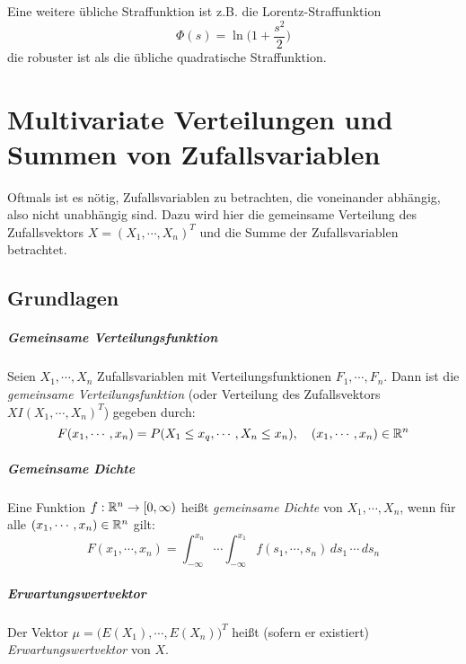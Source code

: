 	        Eine weitere übliche Straffunktion ist z.B. die Lorentz-Straffunktion
	        \begin{equation*}
		        \Phi(s) = \ln\Big(1 + \frac{s^2}{2}\Big)
	        \end{equation*}
	        die robuster ist als die übliche quadratische Straffunktion.

\chapter{Multivariate Verteilungen und Summen von Zufallsvariablen}
    Oftmals ist es nötig, Zufallsvariablen zu betrachten, die voneinander abhängig, also nicht unabhängig sind. Dazu wird hier die gemeinsame Verteilung des Zufallsvektors \( X = (X_1, \cdots, X_n)^T \) und die Summe der Zufallsvariablen betrachtet.

    \section{Grundlagen}
        \paragraph{Gemeinsame Verteilungsfunktion}
            Seien \( X_1, \cdots, X_n \) Zufallsvariablen mit Verteilungsfunktionen \( F_1, \cdots, F_n \). Dann ist die \textit{gemeinsame Verteilungsfunktion} (oder Verteilung des Zufallsvektors \( X I (X_1, \cdots, X_n)^T \)) gegeben durch:
            \begin{equation*}
	            F(x_1, \cdots, x_n) = P(X_1 \leq x_q, \cdots, X_n \leq x_n), \quad (x_1, \cdots, x_n) \in \mathbb{R}^n
            \end{equation*}
        
        \paragraph{Gemeinsame Dichte}
            Eine Funktion \( f : \mathbb{R}^n \rightarrow [0, \infty) \) heißt \textit{gemeinsame Dichte} von \( X_1, \cdots, X_n \), wenn für alle \( (x_1, \cdots, x_n) \in \mathbb{R}^n \) gilt:
            \begin{equation*}
	            F(x_1, \cdots, x_n) = \int_{-\infty}^{x_n} \! \cdots \int_{-\infty}^{x_1} \! f(s_1, \cdots, s_n) \, ds_1 \, \cdots \, ds_n
            \end{equation*}
        
        \paragraph{Erwartungswertvektor}
            Der Vektor \( \mu = \big( E(X_1), \cdots, E(X_n) \big)^T \) heißt (sofern er existiert) \textit{Erwartungswertvektor} von \(X\).
        

